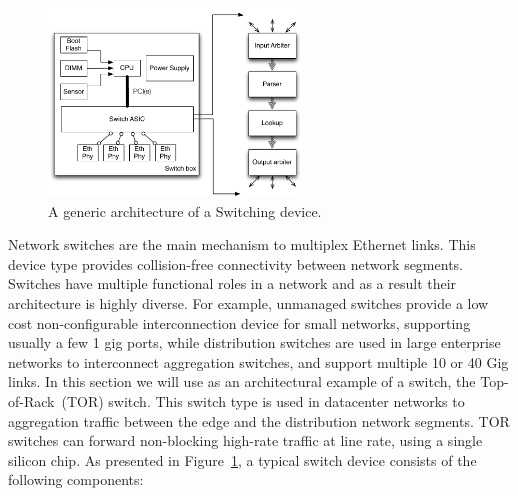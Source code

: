 \begin{figure}
\includegraphics[width=0.6\textwidth]{Background/BackgroundFigs/switch_design}
\caption{A generic architecture of a Switching device.}
\label{fig:background:switch_design}
\end{figure}

Network switches are the main mechanism to multiplex Ethernet links.  This
device type provides collision-free connectivity between network segments.
Switches have multiple functional roles in a network and as a result their
architecture is highly diverse. For example, unmanaged switches provide a low
cost non-configurable interconnection device for small networks, supporting
usually a few 1 gig ports, while distribution switches are used in large
enterprise networks to interconnect aggregation switches, and support multiple
10 or 40 Gig links.  In this section we will use as an architectural example of
a switch, the Top-of-Rack~(TOR) switch.  This switch type is used in datacenter
networks to aggregation traffic between the edge and the distribution network
segments.  TOR switches can forward non-blocking high-rate traffic at line rate,
using a single silicon chip.  As presented in
Figure~\ref{fig:background:switch_design}, a typical switch device consists of
the following components:

